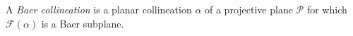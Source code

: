 A \textit{Baer collineation} is a planar collineation $\alpha$ of a projective plane $\mathcal{P}$ for which $\mathcal{F}(\alpha)$ is a Baer subplane.
